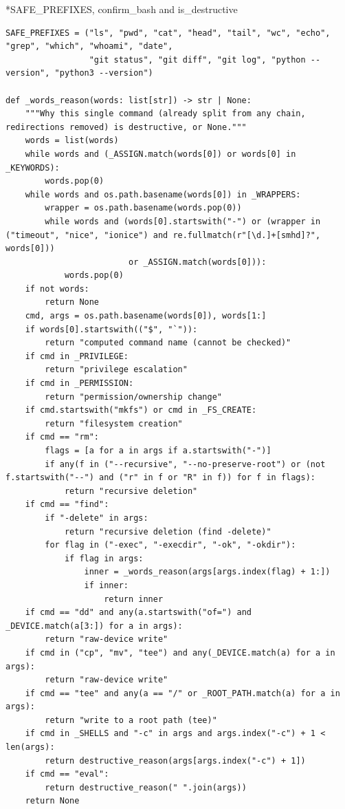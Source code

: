\documentclass[11pt]{article}
\makeatletter
\renewcommand\subsection{\@startsection{subsection}{2}{\z@}{-2.2ex \@plus -1ex \@minus -.2ex}{0.8ex \@plus.2ex}{\normalfont\fontsize{12}{14.5}\selectfont\bfseries}}
\makeatother
\begin{document}
\subsection*{SAFE\_PREFIXES, confirm\_bash and is\_destructive}
\begingroup\lstset{basicstyle=\ttfamily\tiny}
\begin{lstlisting}
SAFE_PREFIXES = ("ls", "pwd", "cat", "head", "tail", "wc", "echo", "grep", "which", "whoami", "date",
                 "git status", "git diff", "git log", "python --version", "python3 --version")

def _words_reason(words: list[str]) -> str | None:
    """Why this single command (already split from any chain, redirections removed) is destructive, or None."""
    words = list(words)
    while words and (_ASSIGN.match(words[0]) or words[0] in _KEYWORDS):
        words.pop(0)
    while words and os.path.basename(words[0]) in _WRAPPERS:
        wrapper = os.path.basename(words.pop(0))
        while words and (words[0].startswith("-") or (wrapper in ("timeout", "nice", "ionice") and re.fullmatch(r"[\d.]+[smhd]?", words[0]))
                         or _ASSIGN.match(words[0])):
            words.pop(0)
    if not words:
        return None
    cmd, args = os.path.basename(words[0]), words[1:]
    if words[0].startswith(("$", "`")):
        return "computed command name (cannot be checked)"
    if cmd in _PRIVILEGE:
        return "privilege escalation"
    if cmd in _PERMISSION:
        return "permission/ownership change"
    if cmd.startswith("mkfs") or cmd in _FS_CREATE:
        return "filesystem creation"
    if cmd == "rm":
        flags = [a for a in args if a.startswith("-")]
        if any(f in ("--recursive", "--no-preserve-root") or (not f.startswith("--") and ("r" in f or "R" in f)) for f in flags):
            return "recursive deletion"
    if cmd == "find":
        if "-delete" in args:
            return "recursive deletion (find -delete)"
        for flag in ("-exec", "-execdir", "-ok", "-okdir"):
            if flag in args:
                inner = _words_reason(args[args.index(flag) + 1:])
                if inner:
                    return inner
    if cmd == "dd" and any(a.startswith("of=") and _DEVICE.match(a[3:]) for a in args):
        return "raw-device write"
    if cmd in ("cp", "mv", "tee") and any(_DEVICE.match(a) for a in args):
        return "raw-device write"
    if cmd == "tee" and any(a == "/" or _ROOT_PATH.match(a) for a in args):
        return "write to a root path (tee)"
    if cmd in _SHELLS and "-c" in args and args.index("-c") + 1 < len(args):
        return destructive_reason(args[args.index("-c") + 1])
    if cmd == "eval":
        return destructive_reason(" ".join(args))
    return None


\end{lstlisting}
\end{document}
